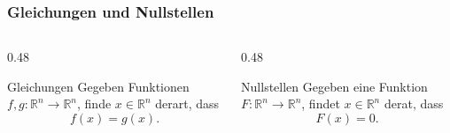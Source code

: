 %
%
%
\begin{frame}
\frametitle{Gleichungen und Nullstellen}
\begin{columns}[t]
\begin{column}{0.48\hsize}
\begin{block}{Gleichungen}
Gegeben Funktionen $f,g\colon\mathbb R^n\to\mathbb R^n$, finde $x\in\mathbb R^n$
derart, dass
\[
f(x) = g(x).
\]
\end{block}
\end{column}
\begin{column}{0.48\hsize}
\begin{block}{Nullstellen}
Gegeben eine Funktion
$F\colon\mathbb R^n\to\mathbb R^n$, findet $x\in\mathbb R^n$
derat, dass
\[
F(x)=0.
\]
\end{block}
\end{column}
\end{columns}
\end{frame}

